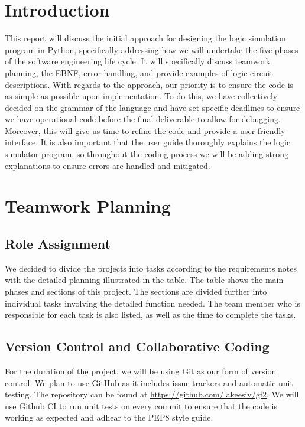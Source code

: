 \documentclass[10pt]{article}
\date{\today}
\begin{document}
\createtitlepage

\section{Introduction}

This report will discuss the initial approach for designing the logic simulation program in Python, specifically addressing how we will undertake the five phases of the software engineering life cycle. It will specifically discuss teamwork planning, the EBNF, error handling, and provide examples of logic circuit descriptions. 
With regards to the approach, our priority is to ensure the code is as simple as possible upon implementation. To do this, we have collectively decided on the grammar of the language and have set specific deadlines to ensure we have operational code before the final deliverable to allow for debugging. Moreover, this will give us time to refine the code and provide a user-friendly interface. It is also important that the user guide thoroughly explains the logic simulator program, so throughout the coding process we will be adding strong explanations to ensure errors are handled and mitigated.




\section{Teamwork Planning}
\subsection{Role Assignment}


\noi We decided to divide the projects into tasks according to the requirements notes with the detailed planning illustrated in the table. The table shows the main phases and sections of this project. The sections are divided further into individual tasks involving the detailed function needed. The team member who is responsible for each task is also listed, as well as the time to complete the tasks. 



\subsection{Version Control and Collaborative Coding}

For the duration of the project, we will be using Git as our form of version control. We plan to use GitHub as it includes issue trackers and automatic unit testing. The repository can be found at \url{https://github.com/lakeesiv/gf2}. We will use Github CI to run unit tests on every commit to ensure that the code is working as expected and adhear to the PEP8 style guide.
\end{document}
